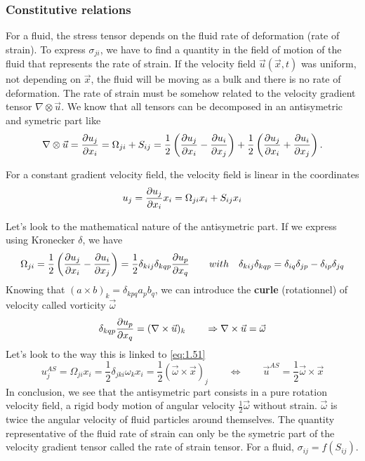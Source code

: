 	\subsubsection{Constitutive relations} 
		For a fluid, the stress tensor depends on the fluid rate of deformation (rate of strain). To express $\sigma _{ji}$, we have to find a quantity in the field of motion of the fluid that represents the rate of strain. If the velocity field $\vec{u}(\vec{x},t)$ was uniform, not depending on $\vec{x}$, the fluid will be moving as a bulk and there is no rate of deformation. The rate of strain must be somehow related to the velocity gradient tensor $\nabla \otimes \vec{u}$. We know that all tensors can be decomposed in an antisymetric and symetric part like 
		\begin{equation}
			\nabla \otimes \vec{u} = \frac{\partial u_j}{\partial x_i} = \Omega _{ji} + S _{ij} = \frac{1}{2} \left( \frac{\partial u_j}{\partial x_i} - \frac{\partial u_i}{\partial x_j} \right) + \frac{1}{2} \left( \frac{\partial u_j}{\partial x_i} + \frac{\partial u_i}{\partial x_j} \right).
		\end{equation}
		
		For a constant gradient velocity field, the velocity field is linear in the coordinates
		\begin{equation}
			u_j = \frac{\partial u_j}{\partial x_i}x_i = \Omega _{ji} x_i + S _{ij} x_i
			\label{eq:1.51}
		\end{equation}
		
		Let's look to the mathematical nature of the antisymetric part.  If we express using Kronecker $\delta$, we have
		\begin{equation}
			\Omega _{ji} =\frac{1}{2} \left( \frac{\partial u_j}{\partial x_i} - \frac{\partial u_i}{\partial x_j} \right) = \frac{1}{2} \delta _{kij}\delta _{kqp} \frac{\partial u_p}{\partial x_q} \qquad 
			with \quad \delta _{kij}\delta _{kqp} = \delta _{iq}\delta _{jp} - \delta _{ip}\delta _{jq} 
		\end{equation}
		Knowing that $(a \times b)_k = \delta _{kpq} a_p b_q$, we can introduce the \textbf{curle} (rotationnel) of velocity called vorticity $\vec{\omega}$
		\begin{equation}
			\delta _{kqp} \frac{\partial u_p}{\partial x_q} = (\nabla \times \vec{u})_k \qquad \Rightarrow \nabla \times \vec{u} = \vec{\omega}
		\end{equation}		 
		Let's look to the way this is linked to \eqref{eq:1.51}
		\begin{equation}
			 u_j^{AS} = \Omega _{ji}x_i = \frac{1}{2} \delta _{jki} \omega _k x_i = \frac{1}{2} (\vec{\omega} \times \vec{x})_j
			\qquad \Leftrightarrow \qquad 
			\vec{u}^{AS} = \frac{1}{2} \vec{\omega}\times \vec{x}
		\end{equation}
	 	In conclusion, we see that the antisymetric part consists in a pure rotation velocity field, a rigid body motion of angular velocity $\frac{1}{2}\vec{\omega}$ without strain. $\vec{\omega}$ is twice the angular velocity of fluid particles around themselves. The quantity representative of the fluid rate of strain can only be the symetric part of the velocity gradient tensor called the rate of strain tensor. For a fluid, $\sigma _{ij} = f(S_{ij})$. \\
	 	
